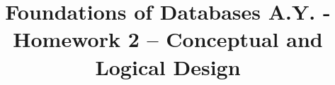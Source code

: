 \usepackage[margin=25mm]{geometry}
\usepackage{titlesec}
\usepackage{xcolor}
\usepackage{longtable}
\usepackage{graphicx}
\usepackage{advdate}
\usepackage{cmbright}
\usepackage{array}
\usepackage{makecell}
\usepackage{multirow}



\usepackage{sectsty}
\setcounter{secnumdepth}{0}
\allsectionsfont{\sffamily\color{UnipdRed}}


\usepackage{fancyhdr}
\pagestyle{fancy}
\renewcommand{\headrulewidth}{0pt}
\renewcommand{\footrulewidth}{0pt}
\setlength\headheight{80.0pt}
\addtolength{\textheight}{-80.0pt}
\cfoot{}



\makeatletter         
\renewcommand\maketitle{
{\raggedright 
\begin{center}

{   
    \Large\bfseries\sffamily 
    \@title}\\[4ex] 
    \Large
    \textbf{Master Degree in Computer Engineering\\
    Master Degree in Cybersecurity\\
    Master Degree in ICT for Internet and Multimedia\\}
    \large
    \vspace{\baselineskip}
    \deadline{November 24}
    \vspace{30mm}
    
    \end{center}}
    \thispagestyle{fancy}
    \pagebreak
    \pagestyle{plain}
    \setlength\headheight{25.0pt}
    \addtolength{\textheight}{-25.0pt}
}
\makeatother


\newcommand{\hw}{Homework 2 – Conceptual and Logical Design}


\title{
Foundations of Databases A.Y. \the\year{}-\AdvanceDate[365]\the\year{}\\
\vspace*{0.5\baselineskip}
\hw}

\newcommand{\deadline}[1]{Deadline: #1, \the\year{}}



